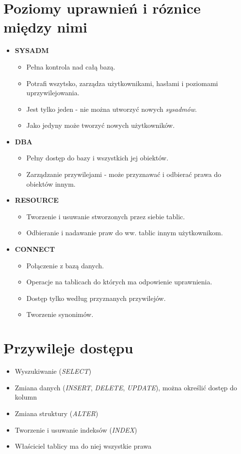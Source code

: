 \documentclass[a4paper,twoside]{article}
\begin{document}
  	\section*{Poziomy uprawnień i róznice między nimi}
  	\begin{itemize}
  		\item \textbf{SYSADM}
  		\begin{itemize}
  			\item Pełna kontrola nad całą bazą.
  			\item Potrafi wszytsko, zarządza użytkownikami, hasłami i poziomami uprzywilejowania.
  			\item Jest tylko jeden - nie można utworzyć nowych \emph{sysadmów}.
  			\item Jako jedyny może tworzyć nowych użytkowników.
  		\end{itemize}
  		\item \textbf{DBA}
  		\begin{itemize}
  			\item Pełny dostęp do bazy i wszystkich jej obiektów.
  			\item Zarządzanie przywilejami - może przyznawać i odbierać prawa do obiektów innym.
  		\end{itemize}
  		\item \textbf{RESOURCE}
  		\begin{itemize}
  			\item Tworzenie i usuwanie stworzonych przez siebie tablic.
  			\item Odbieranie i nadawanie praw do ww. tablic innym użytkownikom.
  		\end{itemize}
  		\item \textbf{CONNECT}
  		\begin{itemize}
  			\item Połączenie z bazą danych.
  			\item Operacje na tablicach do których ma odpowienie uprawnienia.
  			\item Dostęp tylko według przyznanych przywilejów.
  			\item Tworzenie synonimów.
  		\end{itemize}
  	\end{itemize}
  	
  	\section*{Przywileje dostępu}
  	\begin{itemize}
  		\item Wyszukiwanie (\emph{SELECT}) 
  		\item Zmiana danych (\emph{INSERT}, \emph{DELETE}, \emph{UPDATE}), można określić dostęp do kolumn 
  		\item Zmiana struktury (\emph{ALTER}) 
  		\item Tworzenie i usuwanie indeksów (\emph{INDEX})
  		\item Właściciel tablicy ma do niej wszystkie prawa
  	\end{itemize}
  	
\end{document}
